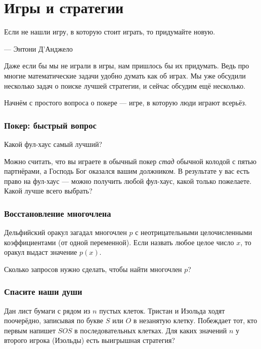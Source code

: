 \chapter{Игры и стратегии}


\setlength{\epigraphwidth}{.63\textwidth}
\epigraph{Если не нашли игру, в которую стоит играть, то придумайте новую.
}{— Энтони Д'Анджело}%

Даже если бы мы не играли в игры, нам пришлось бы их придумать.
Ведь про многие математические задачи удобно думать как об играх.
Мы уже обсудили несколько задач о поиске лучшей стратегии, и сейчас обсудим ещё несколько.

Начнём с простого вопроса о покере --- игре, в которую люди играют всерьёз.

\subsection*{Покер: быстрый вопрос}

Какой фул-хаус самый лучший?

Можно считать, что вы играете в обычный покер \emph{стад} обычной колодой с пятью партнёрами, а Господь Бог оказался вашим должником.
В результате у вас есть право на фул-хаус --- можно получить любой фул-хаус, какой только пожелаете.
Какой лучше всего выбрать?

\subsection*{Восстановление многочлена}

Дельфийский оракул загадал многочлен $p$ с неотрицательными целочисленными коэффициентами (от одной переменной).
Если назвать любое целое число $x$, то оракул выдаст значение $p(x)$.

Сколько запросов нужно сделать, чтобы найти многочлен $p$?

\subsection*{Спасите наши души}

Дан лист бумаги с рядом из $n$ пустых клеток.
Тристан и Изольда ходят поочерёдно, записывая по букве $S$ или $O$ в незанятую клетку.
Побеждает тот, кто первым напишет $SOS$ в последовательных клетках.
Для каких значений $n$ у второго игрока (Изольды) есть выигрышная стратегия?


